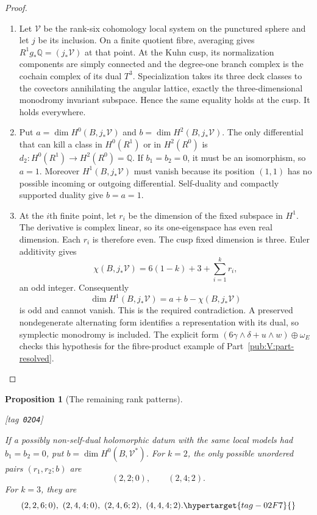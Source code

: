 \documentclass[11pt,a4paper]{article}
\numberwithin{equation}{section}
\newtheorem{proposition}[proposition]{Proposition}
\theoremstyle{definition}
\newcommand{\StatementRecord}[4]{{\upshape\footnotesize[tag~\texttt{#3}]}\enspace\ignorespaces}
\begin{document}
\begin{proof}
\begin{enumerate}[label=\arabic*.]
\item Let $\mathcal V$ be the rank-six cohomology local system on
the punctured sphere and let $j$ be its inclusion.  On a finite
quotient fibre, averaging gives $R^1g_*\mathbb Q=(j_*\mathcal V)$
at that point.  At the Kuhn cusp, its normalization components
are simply connected and the degree-one branch complex is
the cochain complex of its dual $T^3$.  Specialization takes
its three deck classes to the covectors annihilating the
angular lattice, exactly the three-dimensional monodromy
invariant subspace.  Hence the same equality holds at the cusp.
It holds everywhere.

\item Put $a=\dim H^0(B,j_*\mathcal V)$ and
$b=\dim H^2(B,j_*\mathcal V)$.  The only differential that
can kill a class in $H^0(R^1)$ or in $H^2(R^0)$ is
$d_2:H^0(R^1)\to H^2(R^0)=\mathbb Q$.  If $b_1=b_2=0$,
it must be an isomorphism, so $a=1$.  Moreover
$H^1(B,j_*\mathcal V)$ must vanish because its position
$(1,1)$ has no possible incoming or outgoing differential.
Self-duality and compactly supported duality give $b=a=1$.

\item At the $i$th finite point, let $r_i$ be the dimension of the
fixed subspace in $H^1$.  The derivative is complex linear,
so its one-eigenspace has even real dimension.  Each $r_i$
is therefore even.  The cusp fixed dimension is three.
Euler additivity gives
\[
 \chi(B,j_*\mathcal V)=6(1-k)+3+\sum_{i=1}^k r_i,
\]
an odd integer.  Consequently
\[
 \dim H^1(B,j_*\mathcal V)=a+b-\chi(B,j_*\mathcal V)
\]
is odd and cannot vanish.  This is the required contradiction.
A preserved nondegenerate alternating form identifies a
representation with its dual, so symplectic monodromy is
included.  The explicit form
$(6\gamma\wedge\delta+u\wedge w)\oplus\omega_E$
checks this hypothesis for the fibre-product example of Part~\ref{pub:V:part-resolved}.

\end{enumerate}
\end{proof}




\begin{proposition}[The remaining rank patterns]\hypertarget{tag-02O4}{}\label{maps:src:F.3.2}
\StatementRecord{maps:src:F.3.2}{proved}{02O4}{the definitions and constructions stated in the proof}


If a possibly non-self-dual holomorphic datum with the same
local models had $b_1=b_2=0$, put
$b=\dim H^0(B,\mathcal V^*)$.  For $k=2$, the only possible
unordered pairs $(r_1,r_2;b)$ are
\[
 (2,2;0),\qquad(2,4;2).
\]
For $k=3$, they are
\begin{equation}
 (2,2,6;0),\ (2,4,4;0),\ (2,4,6;2),\ (4,4,4;2).
 \hypertarget{tag-02F7}{}\label{maps:eq:F.4}
\end{equation}

\end{proposition}
\end{document}
